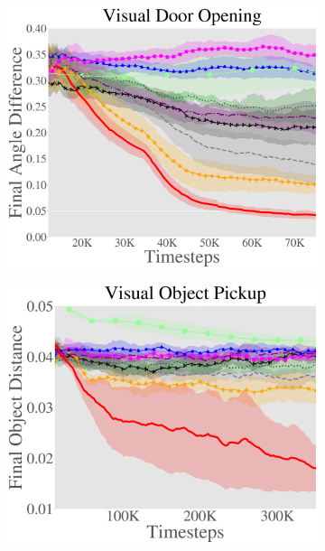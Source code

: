 \begin{figure}[ht!]
    \centering
     \begin{subfigure}[t]{.49\linewidth}
    \centering
          \includegraphics[width=\linewidth]{skewfit/figures/plots/main_sawyer_fig_with_hazan/door.pdf}
  \end{subfigure}
  \hfill
  \begin{subfigure}[t]{.49\linewidth}
    \centering
          \includegraphics[width=\linewidth]{skewfit/figures/plots/main_sawyer_fig_with_hazan/pickup.pdf}
  \end{subfigure}


\end{figure}
